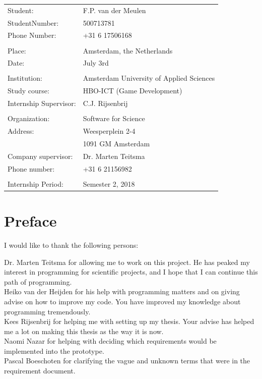 \documentclass[paper=a4, fontsize=11pt,twoside]{scrartcl}	%
\begin{document}
\newpage 
\begin{longtable}{  p{8cm}  p{8cm} }
Student: & F.P. van der Meulen \\
StudentNumber: & 500713781 \\
Phone Number: & +31 6 17506168 \\
\\
Place: & Amsterdam, the Netherlands \\
Date: & July 3rd \\
\\
Institution: & Amsterdam University of Applied Sciences \\
Study course: & HBO-ICT (Game Development) \\
Internship Supervisor: & C.J. Rijsenbrij \\
\\
Organization: & Software for Science \\
Address: & Weesperplein 2-4 \\
 & 1091 GM Amsterdam \\
Company supervisor: & Dr. Marten Teitsma \\
Phone number: & +31 6 21156982\\
\\
Internship Period: & Semester 2, 2018 

\end{longtable}
\newpage



\newpage
\tableofcontents

\newpage
\section*{Preface}
I would like to thank the following persons:

Dr. Marten Teitsma for allowing me to work on this project. He has peaked my interest in programming for scientific projects, and I hope that I can continue this path of programming.\\
Heiko van der Heijden for his help with programming matters and on giving advise on how to improve my code. You have improved my knowledge about programming tremendously. \\
Kees Rijsenbrij for helping me with setting up my thesis. Your advise has helped me a lot on making this thesis as the way it is now. \\
Naomi Nazar for helping with deciding which requirements would be implemented into the prototype. \\
Pascal Boeschoten for clarifying the vague and unknown terms that were in the requirement document.
\end{document}
